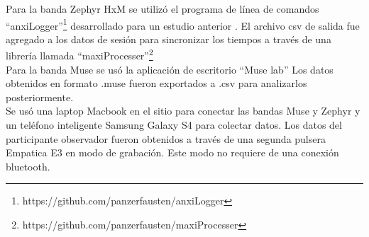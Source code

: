 Para la banda Zephyr HxM se utiliz\'o el programa de l\'inea de comandos ``anxiLogger''\footnote{https://github.com/panzerfausten/anxiLogger} desarrollado para un estudio anterior \citep{Miranda}. El archivo csv de salida fue agregado a los datos de sesi\'on para sincronizar los tiempos a trav\'es de una librer\'ia llamada ``maxiProcesser''\footnote{https://github.com/panzerfausten/maxiProcesser}
\\
Para la banda Muse se us\'o la aplicaci\'on de escritorio ``Muse lab'' Los datos obtenidos en formato .muse fueron exportados a .csv para analizarlos posteriormente.
\\
Se us\'o una laptop Macbook en el sitio para conectar las bandas Muse y Zephyr y un tel\'efono inteligente Samsung Galaxy S4 para colectar datos. Los datos del participante observador fueron obtenidos a trav\'es de una segunda pulsera Empatica E3 en modo de grabaci\'on. Este modo no requiere de una conexi\'on bluetooth.


